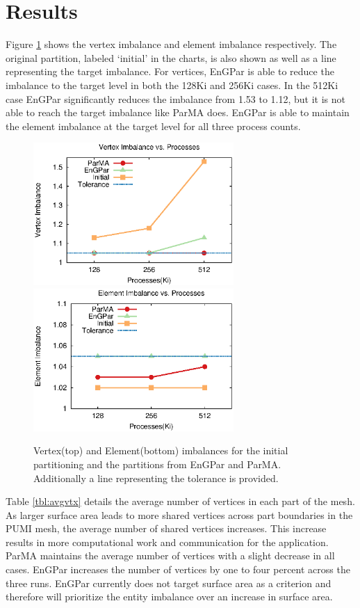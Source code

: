 \section{Results}
Figure \ref{fig:imbgraphs} shows the vertex imbalance
and element imbalance respectively. The original partition,
labeled `initial' in the charts, is also shown
as well as a line representing the target imbalance. For vertices, EnGPar
is able to reduce the imbalance to the target level in both the 128Ki and
256Ki cases. In the 512Ki case EnGPar significantly
reduces the imbalance from 1.53 to 1.12, but it is not able to
reach the target imbalance like ParMA does. EnGPar is able to
maintain the element imbalance at the target level for all three process counts.

\begin{figure}[!ht]
  \centering
  \includegraphics[width=3in]{results/vimb_v_cores}
  \includegraphics[width=3in]{results/eimb_v_cores}
  \caption{Vertex(top) and Element(bottom) imbalances for the initial partitioning and the partitions from EnGPar and ParMA. Additionally a line representing the tolerance is provided.}
  \label{fig:imbgraphs}
\end{figure}

Table \ref{tbl:avgvtx} details the average number of
vertices in each part of the mesh. As larger surface area
leads to more shared vertices across part boundaries in the PUMI mesh, the average number of shared vertices increases. This increase results in more computational work and communication for the application.
ParMA maintains the
average number of vertices with a slight decrease in all cases. EnGPar
increases the number of vertices by one to four percent across the
three runs. EnGPar currently does not target surface area as a criterion
and therefore will prioritize the entity imbalance over an increase in
surface area. 


